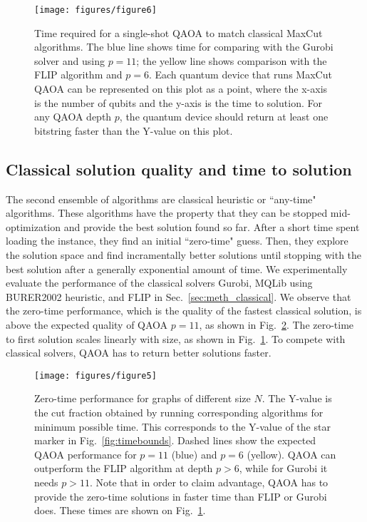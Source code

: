 \begin{figure}
    \centering
    \texttt{[image: figures/figure6]}
    \caption{
    Time required for a single-shot QAOA to match classical MaxCut algorithms.
    The blue line shows time for comparing with the Gurobi solver and using $p=11$;  the yellow line shows comparison with the FLIP algorithm and $p=6$.
    Each quantum device that runs MaxCut QAOA can be represented on this plot as a point, where the x-axis is the number of qubits and the y-axis is the time to solution. 
    For any QAOA depth $p$, the quantum device should return at least one bitstring faster than the Y-value on this plot.
    }
    \label{fig:adv_freq}
\end{figure}

\subsection{Classical solution quality and time to solution}\label{sec:classical_results}

The second ensemble of algorithms are classical heuristic or ``any-time" algorithms. These algorithms have the property that they can be stopped mid-optimization and provide the best solution found so far. After a short time spent loading the instance, they find an initial ``zero-time" guess. Then, they explore the solution space and find incramentally better solutions until stopping with the best solution after a generally exponential amount of time. We experimentally evaluate the performance of the classical solvers Gurobi, MQLib using BURER2002 heuristic, and FLIP in Sec.~\ref{sec:meth_classical}. We observe that the zero-time performance, which is the quality of the fastest classical solution, is above the expected quality of QAOA $p=11$, as shown in Fig.~\ref{fig:t0_cutf}. The zero-time to first solution scales linearly with size, as shown in Fig.~\ref{fig:adv_freq}. To compete with classical solvers, QAOA has to return better solutions faster.

\begin{figure}
    \texttt{[image: figures/figure5]}
    \caption{
    Zero-time performance for graphs of different size $N$.
    The Y-value is the cut fraction obtained by running corresponding algorithms for minimum possible time. This corresponds to the Y-value of the star marker in Fig.~\ref{fig:timebounds}.
    Dashed lines show the expected QAOA performance for $p=11$ (blue) and $p=6$ (yellow). QAOA can outperform the FLIP algorithm at depth $p>6$, while for Gurobi it needs $p>11$.
    Note that in order to claim advantage, QAOA has to provide the zero-time solutions in faster time than FLIP or Gurobi does. These times are shown on Fig.~\ref{fig:adv_freq}.
    }
    \label{fig:t0_cutf}
\end{figure}
